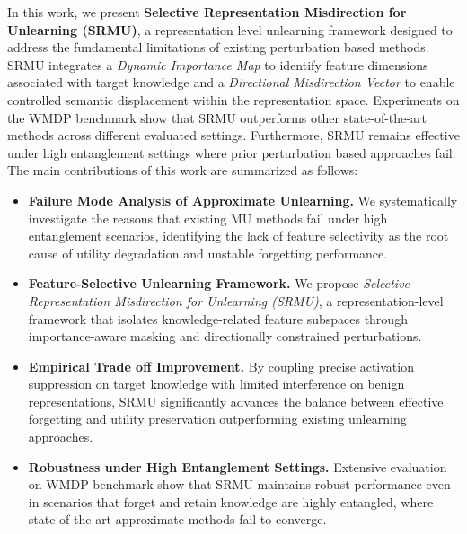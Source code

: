 In this work, we present \textbf{Selective Representation Misdirection for Unlearning (SRMU)}, a representation level unlearning framework designed to address the fundamental limitations of existing perturbation based methods. SRMU integrates a \emph{Dynamic Importance Map} to identify feature dimensions associated with target knowledge and a \emph{Directional Misdirection Vector} to enable controlled semantic displacement within the representation space. Experiments on the WMDP benchmark show that SRMU outperforms other state-of-the-art methods across different evaluated settings. Furthermore, SRMU remains effective under high entanglement settings where prior perturbation based approaches fail. The main contributions of this work are summarized as follows:
\begin{itemize}
    \item \textbf{Failure Mode Analysis of Approximate Unlearning.} We systematically investigate the reasons that existing MU methods fail under high entanglement scenarios, identifying the lack of feature selectivity as the root cause of utility degradation and unstable forgetting performance.

    \item \textbf{Feature-Selective Unlearning Framework.} We propose \emph{Selective Representation Misdirection for Unlearning (SRMU)}, a representation-level framework that isolates knowledge-related feature subspaces through importance-aware masking and directionally constrained perturbations.

    \item \textbf{Empirical Trade off Improvement.} By coupling precise activation suppression on target knowledge with limited interference on benign representations, SRMU significantly advances the balance between effective forgetting and utility preservation outperforming existing unlearning approaches.

    \item \textbf{Robustness under High Entanglement Settings.} Extensive evaluation on WMDP benchmark show that SRMU maintains robust performance even in scenarios that forget and retain knowledge are highly entangled, where state-of-the-art approximate methods fail to converge.
\end{itemize}




